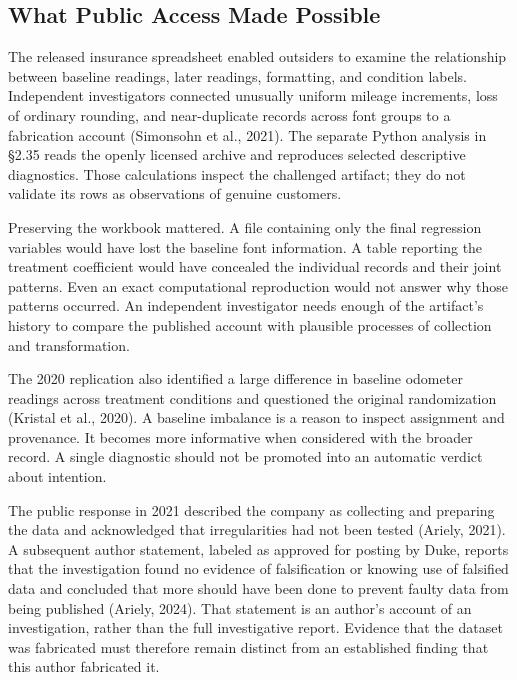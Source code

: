 \hypertarget{M09-what-public-access-made-possible}{%
\subsection{What Public Access Made
Possible}\label{M09-what-public-access-made-possible}}

\noindent \noindent The released insurance spreadsheet enabled outsiders to
examine the relationship between baseline readings, later readings,
formatting, and condition labels. Independent investigators connected
unusually uniform mileage increments, loss of ordinary rounding, and
near-duplicate records across font groups to a fabrication account
(Simonsohn et al., 2021). The separate Python analysis in §2.35 reads
the openly licensed archive and reproduces selected descriptive
diagnostics. Those calculations inspect the challenged artifact; they do
not validate its rows as observations of genuine customers.

Preserving the workbook mattered. A file containing only the final
regression variables would have lost the baseline font information. A
table reporting the treatment coefficient would have concealed the
individual records and their joint patterns. Even an exact computational
reproduction would not answer why those patterns occurred. An
independent investigator needs enough of the artifact's history to
compare the published account with plausible processes of collection and
transformation.

The 2020 replication also identified a large difference in baseline
odometer readings across treatment conditions and questioned the
original randomization (Kristal et al., 2020). A baseline imbalance is a
reason to inspect assignment and provenance. It becomes more informative
when considered with the broader record. A single diagnostic should not
be promoted into an automatic verdict about intention.

The public response in 2021 described the company as collecting and
preparing the data and acknowledged that irregularities had not been
tested (Ariely, 2021). A subsequent author statement, labeled as
approved for posting by Duke, reports that the investigation found no
evidence of falsification or knowing use of falsified data and concluded
that more should have been done to prevent faulty data from being
published (Ariely, 2024). That statement is an author's account of an
investigation, rather than the full investigative report. Evidence that
the dataset was fabricated must therefore remain distinct from an
established finding that this author fabricated it.


